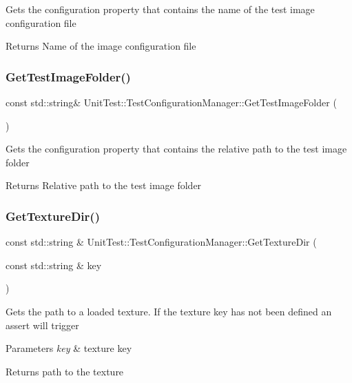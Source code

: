 Gets the configuration property that contains the name of the test image configuration file \begin{DoxyReturn}{Returns}
Name of the image configuration file 
\end{DoxyReturn}
\mbox{\label{class_unit_test_1_1_test_configuration_manager_a246758c1638ac8a8966c7d0e8e02085b}} 
\subsubsection{\texorpdfstring{GetTestImageFolder()}{GetTestImageFolder()}}
{\footnotesize\ttfamily const std\+::string\& Unit\+Test\+::\+Test\+Configuration\+Manager\+::\+Get\+Test\+Image\+Folder (\begin{DoxyParamCaption}{ }\end{DoxyParamCaption})\hspace{0.3cm}{\ttfamily [inline]}}

Gets the configuration property that contains the relative path to the test image folder \begin{DoxyReturn}{Returns}
Relative path to the test image folder 
\end{DoxyReturn}
\mbox{\label{class_unit_test_1_1_test_configuration_manager_a9467f8835450de0622c9be41cf88ed79}} 
\subsubsection{\texorpdfstring{GetTextureDir()}{GetTextureDir()}}
{\footnotesize\ttfamily const std\+::string \& Unit\+Test\+::\+Test\+Configuration\+Manager\+::\+Get\+Texture\+Dir (\begin{DoxyParamCaption}\item[{const std\+::string \&}]{key }\end{DoxyParamCaption})}

Gets the path to a loaded texture. If the texture key has not been defined an assert will trigger 
\begin{DoxyParams}{Parameters}
{\em key} & texture key \\
\hline
\end{DoxyParams}
\begin{DoxyReturn}{Returns}
path to the texture 
\end{DoxyReturn}



